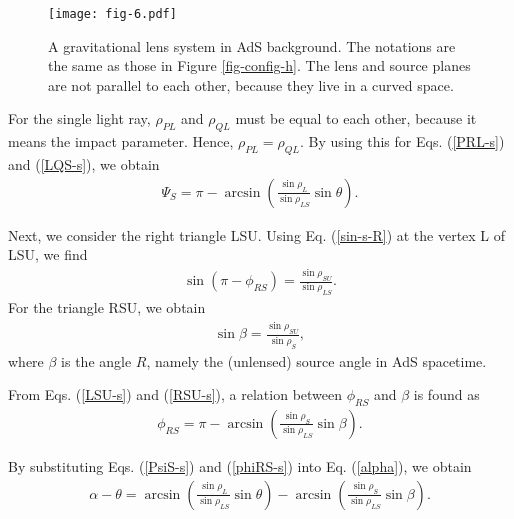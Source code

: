 \documentclass[twocolumn,showpacs,preprintnumbers,amsmath,amssymb]{revtex4-1}
\begin{document}
\begin{figure}
\texttt{[image: fig-6.pdf]}
\caption{
A gravitational lens system in AdS background. 
The notations are the same as those in Figure \ref{fig-config-h}.  
The lens and source planes are not parallel to each other, 
because they live in a curved space. 
}
\label{fig-config-s}
\end{figure}





For the single light ray, $\rho_{PL}$ and $\rho_{QL}$ 
must be equal to each other, 
because it means the impact parameter. 
Hence, $\rho_{PL} = \rho_{QL}$. 
By using this for Eqs. (\ref{PRL-s}) and (\ref{LQS-s}), 
we obtain 
\begin{align}
\Psi_S 
= 
\pi - \arcsin\left(\frac{\sin\rho_L}{\sin\rho_{LS}}\sin\theta\right) . 
\label{PsiS-s}
\end{align}

Next, we consider the right triangle LSU. 
Using Eq. (\ref{sin-s-R}) at the vertex L of LSU, 
we find 
\begin{align}
\sin(\pi - \phi_{RS}) 
=
\frac{\sin\rho_{SU}}{\sin\rho_{LS}} . 
\label{LSU-s}
\end{align}
For the triangle RSU, 
we obtain 
\begin{align}
\sin\beta 
=
\frac{\sin\rho_{SU}}{\sin\rho_S} , 
\label{RSU-s}
\end{align}
where  
$\beta$ is the angle $R$, 
namely the (unlensed) source angle in AdS spacetime. 

From Eqs. (\ref{LSU-s}) and (\ref{RSU-s}), 
a relation between $\phi_{RS}$ and $\beta$ is found as 
\begin{align}
\phi_{RS} 
= 
\pi - \arcsin\left(\frac{\sin\rho_S}{\sin\rho_{LS}}\sin\beta\right) . 
\label{phiRS-s}
\end{align}

By substituting Eqs. (\ref{PsiS-s}) and (\ref{phiRS-s}) into Eq. (\ref{alpha}), 
we obtain 
\begin{align}
\alpha - \theta 
= 
\arcsin\left(\frac{\sin\rho_L}{\sin\rho_{LS}}\sin\theta\right)
- \arcsin\left(\frac{\sin\rho_S}{\sin\rho_{LS}}\sin\beta\right) . 
\label{lenseq-AdS}
\end{align}
\end{document}
